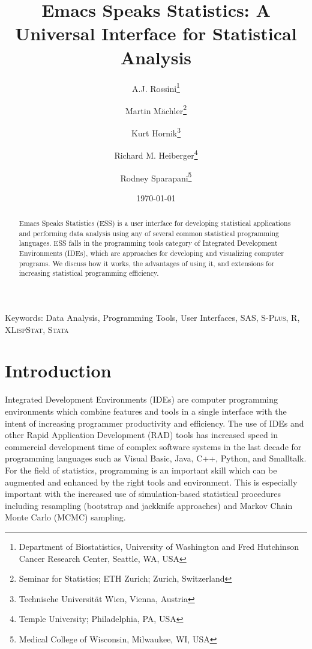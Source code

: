 \documentclass{article}
\title{Emacs Speaks Statistics: A Universal Interface for
  Statistical Analysis}
\author{A.J. Rossini\footnote{Department of Biostatistics, University
    of Washington and Fred Hutchinson Cancer Research Center, Seattle,
    WA, USA} \and Martin M{\"a}chler\footnote{Seminar for Statistics;
    ETH Zurich; Zurich, Switzerland} \and Kurt
  Hornik\footnote{Technische Universit{\"a}t Wien, Vienna, Austria}
  \and Richard M. Heiberger\footnote{Temple University; Philadelphia,
    PA, USA} \and Rodney Sparapani\footnote{Medical College of
    Wisconsin, Milwaukee, WI, USA}}
\date{\today}
\newif\ifpdf
\newcommand*{\Splus}{\textsc{S-Plus}}
\newcommand*{\XLispStat}{\textsc{XLispStat}}
\newcommand*{\Stata}{\textsc{Stata}}
\begin{document}
\ifpdf
  \DeclareGraphicsExtensions{.jpg,.pdf,.png,.mps}
\fi


\singlespace

\maketitle

Keywords: Data Analysis, Programming Tools, User Interfaces, SAS,
\Splus, R, \XLispStat, \Stata

\begin{abstract}
  Emacs Speaks Statistics (ESS) is a user interface for developing
  statistical applications and performing data analysis using any of
  several common statistical programming languages.  ESS falls in the
  programming tools category of Integrated Development Environments
  (IDEs), which are approaches for developing and visualizing computer
  programs.  We discuss how it works, the advantages of using it, and
  extensions for increasing statistical programming efficiency.
\end{abstract}

\doublespace

\section{Introduction}
\label{sec:intro}

Integrated Development Environments (IDEs) are computer programming
environments which combine features and tools in a single interface
with the intent of increasing programmer productivity and efficiency.
The use of IDEs and other Rapid Application Development (RAD) tools
has increased speed in commercial development time of complex software
systems in the last decade for programming languages such as Visual
Basic, Java, C++, Python, and Smalltalk.  For the field of statistics,
programming is an important skill which can be augmented and enhanced
by the right tools and environment.  This is especially important with
the increased use of simulation-based statistical procedures including
resampling (bootstrap and jackknife approaches) and Markov Chain Monte
Carlo (MCMC) sampling.
\end{document}
